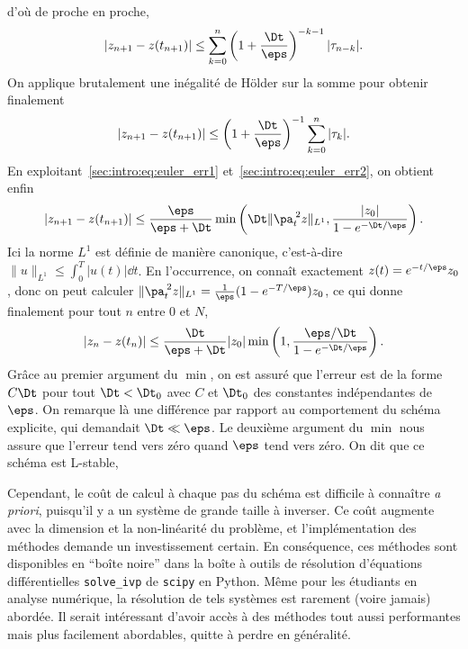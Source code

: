 d'où de proche en proche,
\begin{equation*}
    \left| z_{n+1} - z(t_{n+1}) \right| 
    \leq \sum_{k = 0}^n 
        \left(1 + \frac{\Dt}{\eps}\right)^{-k-1} |\tau_{n-k}| .
\end{equation*}
On applique brutalement une inégalité de Hölder sur la somme pour
obtenir finalement 
\begin{equation*}
    \left| z_{n+1} - z(t_{n+1}) \right| 
    \leq \left(1 + \frac{\Dt}{\eps}\right)^{-1} 
        \sum_{k = 0}^n |\tau_{k}| .
\end{equation*}
En exploitant~\eqref{sec:intro:eq:euler_err1}
et~\eqref{sec:intro:eq:euler_err2}, on obtient enfin 
\begin{equation*}
    \left| z_{n+1} - z(t_{n+1}) \right| 
    \leq \frac{\eps}{\eps + \Dt} \min\left( 
        \Dt \| \pa_t^{\:2} z \|_{L^1} ,
        \frac{ |z_0| }{ 1 - e^{-\Dt/\eps} } \right) .
\end{equation*}
Ici la norme $L^1$ est définie de manière canonique, c'est-à-dire $ \| u
\|_{L^1} \leq \int_0^T | u(t) | \dd t $. En l'occurrence, on connaît
exactement $z(t) = e^{-t/\eps} z_0$, donc on peut calculer $\|
\pa_t^{\:2} z \|_{L^1} = \frac{1}{\eps}(1 - e^{-T/\eps}) z_0$, ce qui
donne finalement pour tout $n$ entre $0$ et $N$, 
\begin{equation*}
    \left| z_n - z(t_n) \right| 
    \leq \frac{\Dt}{\eps + \Dt} |z_0| \min \left(
        1, \frac{\eps/\Dt}{1 - e^{-\Dt/\eps}}
    \right) .
\end{equation*}
Grâce au premier argument du $\min$, on est assuré que l'erreur est de
la forme $C\Dt$ pour tout $\Dt < \Dt_0$ avec $C$ et $\Dt_0$ des
constantes indépendantes de $\eps$. On remarque là une différence par
rapport au comportement du schéma explicite, qui demandait $\Dt \ll
\eps$. 
%
Le deuxième argument du $\min$ nous assure que l'erreur tend vers zéro
quand $\eps$ tend vers zéro. On dit que ce schéma est
L-stable,



Cependant, le coût de calcul à chaque pas du schéma est difficile à
connaître \textit{a priori}, puisqu'il y a un système de grande taille à
inverser. Ce coût augmente avec la dimension et la non-linéarité du
problème, et l'implémentation des méthodes demande un investissement
certain. En conséquence, ces méthodes sont disponibles en \enquote{boîte
noire} dans la boîte à outils de résolution d'équations différentielles
\texttt{solve\_ivp} de \texttt{scipy} en Python. Même pour les étudiants
en analyse numérique, la résolution de tels systèmes est rarement (voire
jamais) abordée. Il serait intéressant d'avoir accès à des méthodes tout
aussi performantes mais plus facilement abordables, quitte à perdre en
généralité. 





